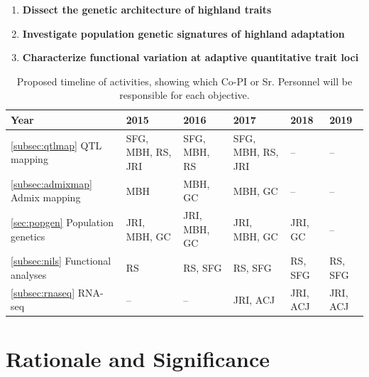 \begin{enumerate}
\item {\bf Dissect the genetic architecture of highland traits}
\item {\bf Investigate population genetic signatures of highland adaptation}
\item {\bf Characterize functional variation at adaptive quantitative trait loci}
\end{enumerate}

\begin{table}[]
\label{tab:timeline}
\begin{center}
\begin{tabular}{p{3.5cm}p{2cm}p{2cm}p{2cm}p{2cm}p{2cm}}\\\toprule  
    \rowcolor{gray!50}
Year & 2015 & 2016 & 2017 & 2018 & 2019 \\\midrule
\ref{subsec:qtlmap} \hspace{3cm} QTL mapping 			& SFG, MBH, RS, JRI 	& SFG, MBH, RS 	& SFG, MBH, RS, JRI 	& -- 			& -- \\\midrule
\ref{subsec:admixmap} \hspace{3cm} Admix mapping		& MBH 				& MBH, GC 		& MBH, GC 			& -- 			& -- \\\midrule
\ref{sec:popgen} \hspace{3cm} Population genetics		& JRI, MBH, GC 		& JRI, MBH, GC  	& JRI, MBH, GC		& JRI, GC 	& -- \\\midrule
\ref{subsec:nils} \hspace{2cm} Functional \mbox{analyses} 		& RS 				& RS, SFG		& RS, SFG 			& RS, SFG 	& RS, SFG  \\\midrule
\ref{subsec:rnaseq} \hspace{2cm} RNA-seq 				& --  					& --  				& JRI, ACJ  			& JRI, ACJ	& JRI, ACJ \\\bottomrule
\end{tabular}
\caption{Proposed timeline of activities, showing which Co-PI or Sr. Personnel will be responsible for each objective. }\label{tab:timeline}
\end{center}
\end{table} 

\section*{Rationale and Significance}

